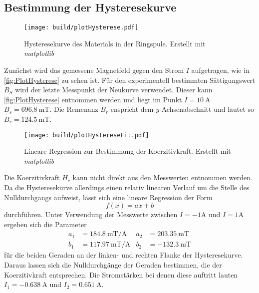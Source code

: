 \subsection{Bestimmung der Hysteresekurve}
\label{A_Hysterese}

\begin{figure}
    \centering
    \caption{Hysteresekurve des Materials in der Ringspule. Erstellt mit \textit{matplotlib} \cite{matplotlib}}
    \label{fig:PlotHysterese}
    \texttt{[image: build/plotHysterese.pdf]}
\end{figure}

Zunächst wird das gemessene Magnetfeld gegen den Strom $I$ aufgetragen, wie in \autoref{fig:PlotHysterese} zu sehen ist. Für den experimentell bestimmten
Sättigungswert $B_S$ wird der letzte Messpunkt der Neukurve verwendet. Dieser kann \autoref{fig:PlotHysterese} entnommen werden und
liegt im Punkt $I = 10\:\unit{\ampere}$ $B_s = 696.8\:\unit{\milli\tesla}$.
Die Remenanz $B_r$ enspricht dem $y$-Achsenabschnitt und lautet so $ B_r = 124.5 \:\unit{\milli\tesla}$.
\begin{figure}
    \centering
    \caption{Lineare Regression zur Bestimmung der Koerzitivkraft. Erstellt mit \textit{matplotlib} \cite{matplotlib}}
    \label{fig:PlotHystereseFit}
    \texttt{[image: build/plotHystereseFit.pdf]}
\end{figure}
Die Koerzitivkraft $H_c$ kann nicht direkt aus den Messwerten entnommen werden. Da die Hysteresekurve allerdings einen relativ linearen Verlauf um die Stelle des Nulldurchgangs 
aufweist, lässt sich eine lineare Regression der Form
\begin{equation*}
    f(x) = ax + b
\end{equation*}
durchführen. Unter Verwendung der Messwerte zwischen $I = -1 \unit{\ampere}$ und $I = 1 \unit{\ampere}$ ergeben sich die Parameter
\begin{align*}
    a_1 &= 184.8 \: \unit{\milli\tesla\per\ampere}    &   a_2 &= 203.35\: \unit{\milli\tesla}   \\  
    b_1 &= 117.97\: \unit{\milli\tesla\per\ampere}    &   b_2 &= -132.3\: \unit{\milli\tesla}
\end{align*}
für die beiden Geraden an der linken- und rechten Flanke der Hysteresekurve. Daraus lassen sich die Nulldurchgänge der Geraden bestimmen, die der Koerzitivkraft entsprechen. 
Die Stromstärken bei denen diese auftritt lauten $I_1 = -0.638 \: \unit{\ampere}$ und $I_2 = 0.651 \: \unit{\ampere}$.
